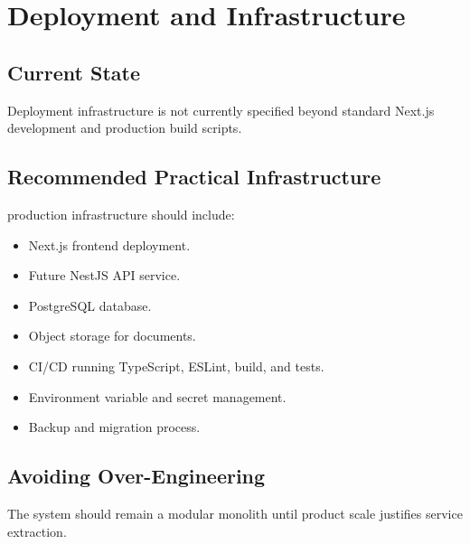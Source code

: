 \chapter{Deployment and Infrastructure}
\section{Current State}
Deployment infrastructure is not currently specified beyond standard Next.js development and production build scripts.

\section{Recommended Practical Infrastructure}
\statusplanned{} production infrastructure should include:
\begin{itemize}
\item Next.js frontend deployment.
\item Future NestJS API service.
\item PostgreSQL database.
\item Object storage for documents.
\item CI/CD running TypeScript, ESLint, build, and tests.
\item Environment variable and secret management.
\item Backup and migration process.
\end{itemize}



\section{Avoiding Over-Engineering}
The system should remain a modular monolith until product scale justifies service extraction.
